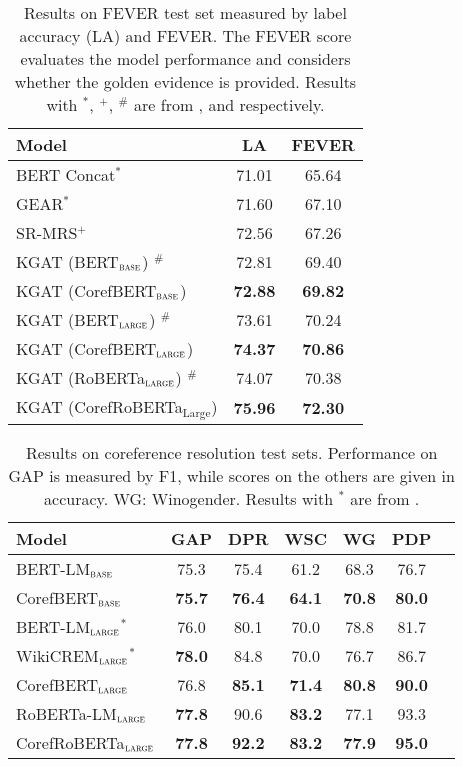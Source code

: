 \documentclass[11pt,a4paper]{article}
\newcommand\BASESIZE{$_{\small \textsc{base}}$\xspace}
\newcommand\LARGESIZE{$_{\small \textsc{large}}$\xspace}
\begin{document}
\begin{table}[!t]
 \small
 \centering
 \begin{tabular}{l c c }
 \toprule

 \multirow{1}{*}{Model}   &  LA        & FEVER\\
 \midrule
 BERT Concat$^*$ & 71.01& 65.64\\
 GEAR$^*$    &71.60 &67.10\\
 SR-MRS$^+$     &72.56& 67.26\\
 KGAT (BERT\BASESIZE) $^{\#}$& 72.81& 69.40\\
 KGAT (CorefBERT\BASESIZE) &\bf{72.88} & \bf{69.82}\\
 \midrule
 KGAT (BERT\LARGESIZE) $^{\#}$& 73.61 & 70.24\\
 KGAT (CorefBERT\LARGESIZE) &\bf{74.37} & \bf{70.86}\\
 \midrule
 KGAT (RoBERTa\LARGESIZE) $^{\#}$& 74.07& 70.38\\
 KGAT (CorefRoBERTa$_{\text{Large}}$) &\bf{75.96} & \bf{72.30}\\
\bottomrule
 \end{tabular}
 \caption{Results on FEVER test set measured by label accuracy (LA) and FEVER. The FEVER score evaluates the model performance and considers whether the golden evidence is provided. Results with $^*$, $^+$, $^{\#}$ are from \citet{Zhoujie}, \citet{SR-MRS} and \citet{Zhenghao} respectively. }
 \label{tab:Fever_result}
\end{table}

\begin{table}[!t]
\small
\centering
\begin{tabular}{l c c c c c c}
\toprule
{Model}  & GAP & DPR  & WSC  & WG & PDP \\
\midrule
BERT-LM\BASESIZE & 75.3 & 75.4 & 61.2   &  68.3 & 76.7 \\
CorefBERT\BASESIZE & \bf{75.7} &  \bf{76.4} & \bf{64.1}&  \bf{70.8}  & \bf{80.0}\\
\midrule
BERT-LM\LARGESIZE$^*$  & 76.0 & 80.1 & 70.0   &  78.8 & 81.7 \\
WikiCREM\LARGESIZE$^*$ & \bf{78.0} & {84.8} & 70.0 & 76.7  & {86.7}\\
CorefBERT\LARGESIZE & 76.8 &  \bf{85.1}& \bf{71.4}&  \bf{80.8}  & \bf{90.0}\\
\midrule
RoBERTa-LM\LARGESIZE  & \bf{77.8} & 90.6 & \bf{83.2}   &  77.1 & 93.3 \\
CorefRoBERTa\LARGESIZE & \bf{77.8} &  \bf{92.2}& \bf{83.2}&  \bf{77.9}  & \bf{95.0}\\
\bottomrule
\end{tabular}
\caption{Results on coreference resolution test sets. Performance on GAP is measured by F1, while scores on the others are given in accuracy.  WG: Winogender. Results with $^*$ are from \citet{wikicrem}. }
\label{tab:Coref_result}
\end{table}
\end{document}
